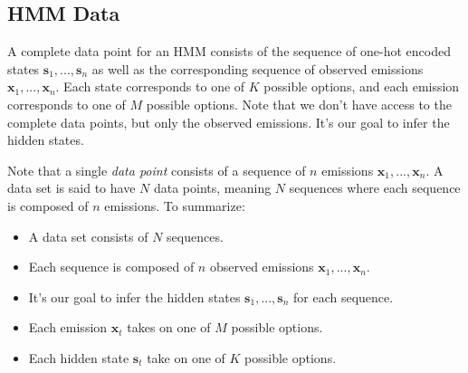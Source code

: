 \subsection{HMM Data}
A complete data point for an HMM consists of the sequence of one-hot encoded states $\textbf{s}_1, ..., \textbf{s}_n$ as well as the corresponding sequence of observed emissions $\textbf{x}_1, ..., \textbf{x}_n$. Each state corresponds to one of $K$ possible options, and each emission corresponds to one of $M$ possible options. Note that we don't have access to the complete data points, but only the observed emissions. It's our goal to infer the hidden states.

Note that a single \textit{data point} consists of a sequence of $n$ emissions $\textbf{x}_1, ..., \textbf{x}_n$. A data set is said to have $N$ data points, meaning $N$ sequences where each sequence is composed of $n$ emissions. To summarize:
\begin{itemize}
	\item A data set consists of $N$ sequences.
	\item Each sequence is composed of $n$ observed emissions $\textbf{x}_1, ..., \textbf{x}_n$.
	\item It's our goal to infer the hidden states $\textbf{s}_1, ..., \textbf{s}_n$ for each sequence.
	\item Each emission $\textbf{x}_{t}$ takes on one of $M$ possible options.
	\item Each hidden state $\textbf{s}_{t}$ take on one of $K$ possible options.
\end{itemize}

